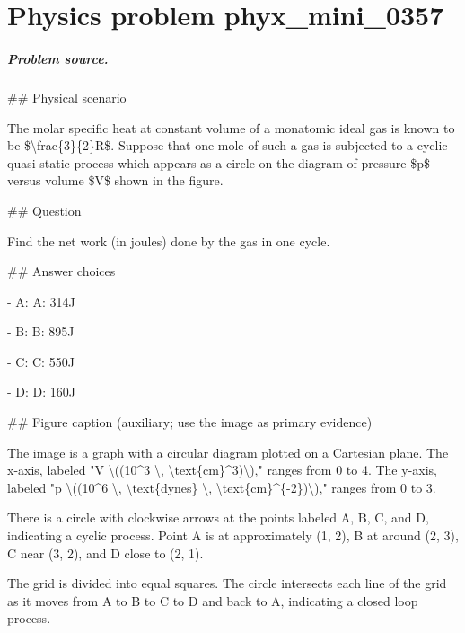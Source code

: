 
\chapter{Physics problem phyx\_mini\_0357}
\label{ch:PhyXMiniProblems_problem_phyx_mini_0357}

\paragraph{Problem source.}
\#\# Physical scenario

The molar specific heat at constant volume of a monatomic ideal gas is known to be \$\textbackslash{}frac\{3\}\{2\}R\$. Suppose that one mole of such a gas is subjected to a cyclic quasi-static process which appears as a circle on the diagram of pressure \$p\$ versus volume \$V\$ shown in the figure.

\#\# Question

Find the net work (in joules) done by the gas in one cycle.

\#\# Answer choices

- A: A: 314J

- B: B: 895J

- C: C: 550J

- D: D: 160J

\#\# Figure caption (auxiliary; use the image as primary evidence)

The image is a graph with a circular diagram plotted on a Cartesian plane. The x-axis, labeled "V \textbackslash{}((10\textasciicircum{}3 \textbackslash{}, \textbackslash{}text\{cm\}\textasciicircum{}3)\textbackslash{})," ranges from 0 to 4. The y-axis, labeled "p \textbackslash{}((10\textasciicircum{}6 \textbackslash{}, \textbackslash{}text\{dynes\} \textbackslash{}, \textbackslash{}text\{cm\}\textasciicircum{}\{-2\})\textbackslash{})," ranges from 0 to 3. 

There is a circle with clockwise arrows at the points labeled A, B, C, and D, indicating a cyclic process. Point A is at approximately (1, 2), B at around (2, 3), C near (3, 2), and D close to (2, 1). 

The grid is divided into equal squares. The circle intersects each line of the grid as it moves from A to B to C to D and back to A, indicating a closed loop process.

